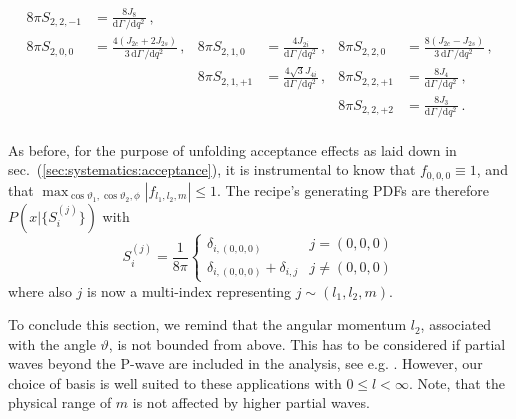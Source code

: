 \documentclass[aps,nofootinbib,preprintnumbers,prd,twocolumn]{revtex4-1}
\newcommand{\refsec}[1]{sec.~(\ref{sec:#1})}
\newcommand{\rmdx}[1]{\mbox{d} #1 \,} %
\renewcommand{\theta}{\vartheta}
\begin{document}
\begin{widetext}
\begin{equation}
\begin{aligned}
    8\pi S_{2, 2, -1} & = \frac{8 J_8}{\rmdx{\Gamma}/\rmdx{q^2}}\,,                                        \\
%
    8\pi S_{2, 0,  0} & = \frac{4 (J_{2c} + 2 J_{2s})}{3\, \rmdx{\Gamma}/\rmdx{q^2}}\,,                    &
    8\pi S_{2, 1,  0} & = \frac{4 J_{2i}}{\rmdx{\Gamma}/\rmdx{q^2}}\,,                                     &
    8\pi S_{2, 2,  0} & = \frac{8 (J_{2c} - J_{2s})}{3\, \rmdx{\Gamma}/\rmdx{q^2}}\,,                      \\
%
                      &                                                                                    &
    8\pi S_{2, 1, +1} & = \frac{4\sqrt{3} J_{4i}}{\rmdx{\Gamma}/\rmdx{q^2}}\,,                             &
    8\pi S_{2, 2, +1} & = \frac{8 J_{4}}{\rmdx{\Gamma}/\rmdx{q^2}}\,,                                      \\
%
                      &                                                                                    &
                      &                                                                                    &
    8\pi S_{2, 2, +2} & = \frac{8 J_3}{\rmdx{\Gamma}/\rmdx{q^2}}\,.                                        \\
\end{aligned}
\end{equation}
\end{widetext}

As before, for the purpose of unfolding acceptance effects as laid down in \refsec{systematics:acceptance}, it is instrumental
to know that $f_{0,0,0} \equiv 1$, and that $\max_{\cos\theta_1,\cos\theta_2,\phi} |f_{l_1, l_2, m}| \leq 1$.
The recipe's generating PDFs are therefore $P(x|\lbrace S_i^{(j)}\rbrace)$ with
\begin{equation}
    \label{eq:recipe:btokstarll}
    S_i^{(j)} = \frac{1}{8\pi}
        \begin{cases}
            \delta_{i,(0,0,0)}                  & j = (0, 0, 0)\\
            \delta_{i,(0,0,0)}  + \delta_{i,j}  & j \neq (0, 0, 0)
        \end{cases}
\end{equation}
where also $j$ is now a multi-index representing $j \sim (l_1, l_2, m)$.

To conclude this section, we remind that the angular momentum $l_2$, associated with the angle $\theta$, is not bounded from above.
This has to be considered if partial waves beyond the P-wave are included in the analysis, see e.g. \cite{Das:2014sra}.
However, our choice of basis is well suited to these applications with $0 \leq l < \infty$. Note, that the
physical range of $m$ is not affected by higher partial waves.
\end{document}

